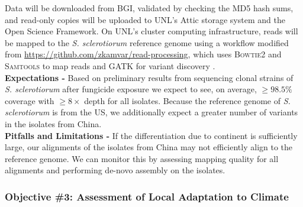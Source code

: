 \documentclass[12pt,letterpaper]{article}
\begin{document}
Data will be downloaded from BGI, validated by checking the MD5 hash sums, and read-only copies will be uploaded to UNL's Attic storage system and the Open Science Framework. 
On UNL's cluster computing infrastructure, reads will be mapped to the \textit{S. sclerotiorum} reference genome using a workflow modified from \url{https://github.com/zkamvar/read-processing}, which uses \textsc{Bowtie2} and \textsc{Samtools} to map reads and \textsc{GATK} for variant discovery \citep{langmead2012fast, li2009sequence, mckenna2010genome, derbyshire2017complete}.\\ 
\noindent \textbf{Expectations -}
Based on preliminary results from sequencing clonal strains of \textit{S. sclerotiorum} after fungicide exposure we expect to see, on average, $\geq98.5\%$ coverage with $\geq8\times$ depth for all isolates. Because the reference genome of \textit{S. sclerotiorum} is from the US, we additionally expect a greater number of variants in the isolates from China.\\
\noindent \textbf{Pitfalls and Limitations -}
If the differentiation due to continent is sufficiently large, our alignments of the isolates from China may not efficiently align to the reference genome. 
We can monitor this by assessing mapping quality for all alignments and performing de-novo assembly on the isolates.

\subsubsection*{Objective \#3: Assessment of Local Adaptation to Climate}
\end{document}
